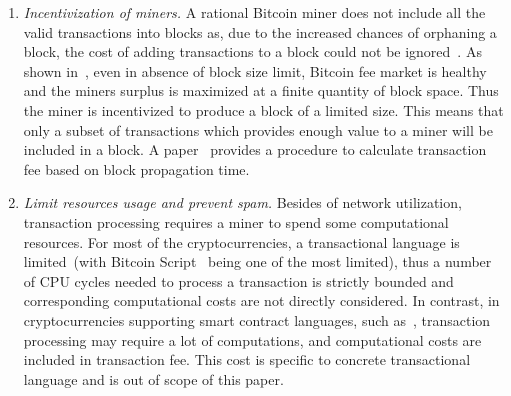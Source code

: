 \documentclass[]{llncs}   %
\begin{document}
\begin{enumerate}
  \item{\em Incentivization of miners.} A rational Bitcoin miner does not
      include all the valid transactions into blocks as, due to the increased
      chances of orphaning a block, the cost of adding transactions to a block
      could not be ignored~\cite{andersen2013,rizun2015transaction}. As shown
      in~\cite{rizun2015transaction}, even in absence of block size limit,
      Bitcoin fee market is healthy and the miners surplus is maximized at a
      finite quantity of block space. Thus the miner is incentivized to produce
      a block of a limited size. This means that only a subset of transactions
      which provides enough value to a miner will be included in a block. A
      paper~\cite{rizun2015transaction} provides a procedure to calculate
      transaction fee based on block propagation time.

  \item{\em Limit resources usage and prevent spam. } Besides of network
      utilization, transaction processing requires a miner to spend some
      computational resources. For most of the cryptocurrencies, a transactional
      language is limited~(with Bitcoin Script~\cite{script} being one of the
      most limited), thus a number of CPU cycles needed to process a transaction
      is strictly bounded and corresponding computational costs are not directly
      considered. In contrast, in cryptocurrencies supporting smart contract
      languages, such as~\cite{seijas2016scripting,tezosScript,solidity},
      transaction processing may require a lot of computations, and
      computational costs are included in transaction fee. This cost is specific
      to concrete transactional language and is out of scope of this paper.
\end{enumerate}
\end{document}
